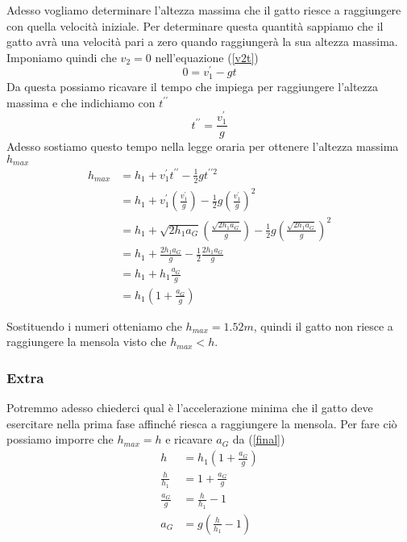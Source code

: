 \documentclass{article}
\begin{document}
Adesso vogliamo determinare l'altezza massima che il gatto riesce a raggiungere con quella velocità iniziale. Per determinare questa quantità sappiamo che il gatto avrà una velocità pari a zero quando raggiungerà la sua altezza massima. Imponiamo quindi che $v_2=0$ nell'equazione (\ref{v2t})
\begin{equation}
  0 = v^\prime_1 -gt 
\end{equation}
Da questa possiamo ricavare il tempo che impiega per raggiungere l'altezza massima e che indichiamo con $t^{\prime\prime}$
\begin{equation}
  t^{\prime\prime} = \frac{v^\prime_1}{g}
\end{equation}
Adesso sostiamo questo tempo nella legge oraria per ottenere l'altezza massima $h_{max}$
\begin{align}
  h_{max} &= h_1 + v^\prime_1 t^{\prime\prime} - \frac{1}{2}g t^{\prime\prime2} \\
          &= h_1 + v^\prime_1 \left(\frac{v^\prime_1}{g}\right) - \frac{1}{2}g \left(\frac{v^\prime_1}{g}\right)^2 \\
          &= h_1 + \sqrt{2h_1 a_G} \left(\frac{\sqrt{2h_1 a_G}}{g}\right) - \frac{1}{2}g \left(\frac{\sqrt{2h_1 a_G}}{g}\right)^2 \\
          &= h_1 + \frac{2h_1 a_G}{g} - \frac{1}{2} \frac{2h_1 a_G}{g} \\
          &= h_1 + h_1 \frac{a_G}{g} \\
          &= h_1\left(1+\frac{a_G}{g}\right) \label{final}
\end{align}

Sostituendo i numeri otteniamo che $h_{max} = 1.52m$, quindi il gatto non riesce a raggiungere la mensola visto che $h_{max} < h$.

\subsubsection*{Extra}

Potremmo adesso chiederci qual è l'accelerazione minima che il gatto deve esercitare nella prima fase affinché riesca a raggiungere la mensola.
Per fare ciò possiamo imporre che $h_{max}=h$ e ricavare $a_G$ da (\ref{final})
\begin{align}
  h &= h_1\left(1+\frac{a_G}{g}\right) \\
  \frac{h}{h_1} &= 1+\frac{a_G}{g} \\
  \frac{a_G}{g} &= \frac{h}{h_1} -1 \\
  a_G &= g \left(\frac{h}{h_1} -1\right) \\
\end{align}
\end{document}
